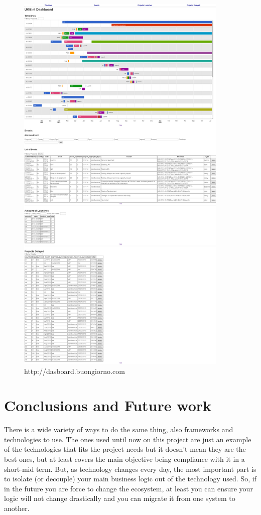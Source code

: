 \begin{figure}[ht!]
	\centering
   	\includegraphics[width=0.9\textwidth]{./resources/dashboard.png}
   	\caption{http://dasboard.buongiorno.com}
   	\label{f_dashboard}
\end{figure}

\chapter{Conclusions and Future work}
There is a wide variety of ways to do the same thing, also frameworks and
technologies to use. The ones used until now on this project are just an example
of the technologies that fits the project needs but it doesn't mean they are the best
ones, but at least covers the main objective being compliance with it in a
short-mid term. But, as technology changes every day, the most important part is
to isolate (or decouple) your main business logic out of the technology used.
So, if in the future you are force to change the ecosystem, at least you can ensure your
logic will not change drastically and you can migrate it from one system to
another.\\

